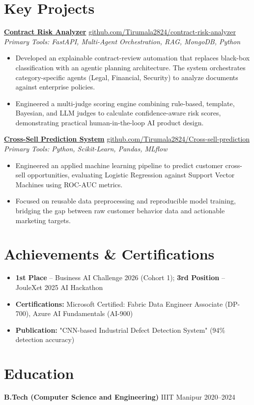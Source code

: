 \documentclass[a4paper,10pt]{article}
\begin{document}
\section*{Key Projects}

\textbf{\href{https://github.com/Tirumala2824/contract-risk-analyzer}{Contract Risk Analyzer}} \hfill \href{https://github.com/Tirumala2824/contract-risk-analyzer}{github.com/Tirumala2824/contract-risk-analyzer} \\
\textit{Primary Tools: FastAPI, Multi-Agent Orchestration, RAG, MongoDB, Python}
\begin{itemize}
    \item Developed an explainable contract-review automation that replaces black-box classification with an agentic planning architecture. The system orchestrates category-specific agents (Legal, Financial, Security) to analyze documents against enterprise policies.
    \item Engineered a multi-judge scoring engine combining rule-based, template, Bayesian, and LLM judges to calculate confidence-aware risk scores, demonstrating practical human-in-the-loop AI product design.
\end{itemize}

\textbf{\href{https://github.com/Tirumala2824/Cross-sell-prediction}{Cross-Sell Prediction System}} \hfill \href{https://github.com/Tirumala2824/Cross-sell-prediction}{github.com/Tirumala2824/Cross-sell-prediction} \\
\textit{Primary Tools: Python, Scikit-Learn, Pandas, MLflow}
\begin{itemize}
    \item Engineered an applied machine learning pipeline to predict customer cross-sell opportunities, evaluating Logistic Regression against Support Vector Machines using ROC-AUC metrics.
    \item Focused on reusable data preprocessing and reproducible model training, bridging the gap between raw customer behavior data and actionable marketing targets.
\end{itemize}

\section*{Achievements \& Certifications}
\begin{itemize}
    \item \textbf{1st Place} -- Business AI Challenge 2026 (Cohort 1); \textbf{3rd Position} -- JouleXet 2025 AI Hackathon
    \item \textbf{Certifications:} Microsoft Certified: Fabric Data Engineer Associate (DP-700), Azure AI Fundamentals (AI-900)
    \item \textbf{Publication:} "CNN-based Industrial Defect Detection System" (94\% detection accuracy)
\end{itemize}

\section*{Education}
\textbf{B.Tech (Computer Science and Engineering)} \hfill IIIT Manipur \hfill 2020--2024
\end{document}
